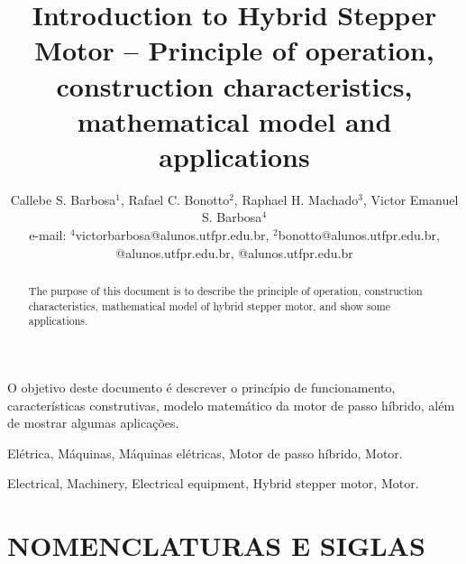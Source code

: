 \usepackage{float}


\title{Introduction to Hybrid Stepper Motor -- Principle of operation, construction characteristics, mathematical model and applications}

\author{Callebe S. Barbosa$^{1}$, Rafael C. Bonotto$^{2}$, Raphael H. Machado$^{3}$, Victor Emanuel S. Barbosa$^{4}$\\
	\normalsize e-mail: $^{4}$victorbarbosa@alunos.utfpr.edu.br, $^{2}$bonotto@alunos.utfpr.edu.br, @alunos.utfpr.edu.br, @alunos.utfpr.edu.br
}



\maketitle

\begin{resumo}
	O objetivo deste documento é descrever o princípio de funcionamento, características construtivas, modelo matemático da motor de passo híbrido, além de mostrar algumas aplicações.
\end{resumo}

\begin{palavraschave}
	Elétrica, Máquinas, Máquinas elétricas, Motor de passo híbrido, Motor.
\end{palavraschave}

\englishtitle

\begin{abstract}
	The purpose of this document is to describe the principle of operation, construction characteristics, mathematical model of hybrid stepper motor, and show some applications.
\end{abstract}

\begin{keywords}
	Electrical, Machinery, Electrical equipment, Hybrid stepper motor, Motor.
\end{keywords}

\section*{NOMENCLATURAS E SIGLAS}

